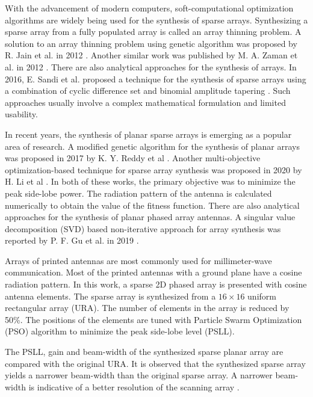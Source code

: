 With the advancement of modern computers, soft-computational optimization algorithms are widely being used for the synthesis of sparse arrays. Synthesizing a sparse array from a fully populated array is called an array thinning problem. A solution to an array thinning problem using genetic algorithm was proposed by R. Jain et al. in 2012 \cite{thinningGA}. Another similar work was published by M. A. Zaman et al. in 2012 \cite{nunUniformLinear}. There are also analytical approaches for the synthesis of arrays. In 2016, E. Sandi et al. proposed a technique for the synthesis of sparse arrays using a combination of cyclic difference set and binomial amplitude tapering \cite{amplitudeTaperingHybrid}. Such approaches usually involve a complex mathematical formulation and limited usability.

In recent years, the synthesis of planar sparse arrays is emerging as a popular area of research. A modified genetic algorithm for the synthesis of planar arrays was proposed in 2017 by K. Y. Reddy et al \cite{randomlySpacedArray}. Another multi-objective optimization-based technique for sparse array synthesis was proposed in 2020 by H. Li et al \cite{selfOrgOpt}. In both of these works, the primary objective was to minimize the peak side-lobe power. The radiation pattern of the antenna is calculated numerically to obtain the value of the fitness function. There are also analytical approaches for the synthesis of planar phased array antennas. A singular value decomposition (SVD) based non-iterative approach for array synthesis was reported by P. F. Gu et al. in 2019 \cite{SyntLargeSparse}.

Arrays of printed antennas are most commonly used for millimeter-wave communication. Most of the printed antennas with a ground plane have a cosine radiation pattern. In this work, a sparse 2D phased array is presented with cosine antenna elements. The sparse array is synthesized from a $16\times 16$ uniform rectangular array (URA). The number of elements in the array is reduced by 50\%. The positions of the elements are tuned with Particle Swarm Optimization (PSO) algorithm to minimize the peak side-lobe level (PSLL).

The PSLL, gain and beam-width of the synthesized sparse planar array are compared with the original URA. It is observed that the synthesized sparse array yields a narrower beam-width than the original sparse array. A narrower beam-width is indicative of a better resolution of the scanning array \cite{sparseDesignConstraints}.

